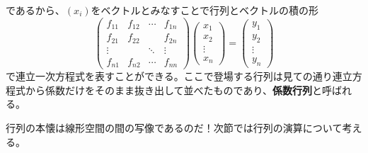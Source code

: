 \documentclass[dvipdfmx]{jsarticle}
\begin{document}
であるから、$(x_i)$をベクトルとみなすことで行列とベクトルの積の形
\[\begin{pmatrix}f_{11}&f_{12}&\cdots&f_{1n}\\f_{21}&f_{22}&{}&f_{2n}\\\vdots&{}&\ddots&\vdots\\f_{n1}&f_{n2}&\cdots&f_{nn}\end{pmatrix}\begin{pmatrix}x_1\\x_2\\\vdots\\x_n\end{pmatrix}=\begin{pmatrix}y_1\\y_2\\\vdots\\y_n\end{pmatrix}\]
で連立一次方程式を表すことができる。ここで登場する行列は見ての通り連立方程式から係数だけをそのまま抜き出して並べたものであり、\textbf{係数行列}と呼ばれる。\\\par
行列の本懐は線形空間の間の写像であるのだ！次節では行列の演算について考える。\newpage
\end{document}
